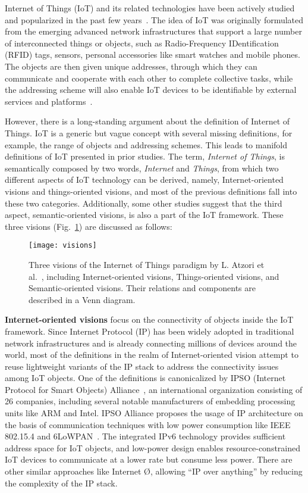  Internet of Things (IoT) and its related technologies have been actively studied and popularized in the past few years~\cite{DBLP:journals/cn/AtzoriIM10}. The idea of IoT was originally formulated from the emerging advanced network infrastructures that support a large number of interconnected things or objects, such as Radio-Frequency IDentification (RFID) tags, sensors, personal accessories like smart watches and mobile phones. The objects are then given unique addresses, through which they can communicate and cooperate with each other to complete collective tasks, while the addressing scheme will also enable IoT devices to be identifiable by external services and platforms~\cite{giusto2010internet}\cite{tan2010future}.

However, there is a long-standing argument about the definition of  Internet of Things. IoT is a generic but vague concept with several missing definitions, for example, the range of objects and addressing schemes. This leads to manifold definitions of IoT presented in prior studies. The term, \textit{Internet of Things}, is semantically composed by two words, \textit{Internet} and \textit{Things}, from which two different aspects of IoT technology can be derived, namely, Internet-oriented visions and things-oriented visions, and most of the previous definitions fall into these two categories. Additionally, some other studies suggest that the third aspect, semantic-oriented visions, is also a part of the IoT framework. These three visions (Fig.~\ref{fig:visions}) are discussed as follows:

\begin{figure}[htbp]
	\centering
  	\texttt{[image: visions]}
  	\caption{Three visions of the Internet of Things paradigm by L. Atzori et al.~\cite{DBLP:journals/cn/AtzoriIM10}, including Internet-oriented visions, Things-oriented visions, and Semantic-oriented visions. Their relations and components are  described in a Venn diagram.}
  	\label{fig:visions}
\end{figure}

\textbf{Internet-oriented visions} focus on the connectivity of objects inside the IoT framework. Since Internet Protocol (IP) has been widely adopted in traditional network infrastructures and is already connecting millions of devices around the world, most of the definitions in the realm of Internet-oriented vision attempt to reuse lightweight variants of the IP stack to address the connectivity issues among IoT objects. One of the definitions is canonicalized by IPSO (Internet Protocol for Smart Objects) Alliance~\cite{vasseur2008ip}, an international organization consisting of 26 companies, including several notable manufacturers of embedding processing units like ARM and Intel. IPSO Alliance proposes the usage of IP architecture on the basis of communication techniques with low power consumption like IEEE 802.15.4 and 6LoWPAN~\cite{culler20096lowpan}. The integrated IPv6 technology  provides sufficient address space for IoT objects, and low-power design enables resource-constrained IoT devices to communicate at a lower rate but consume less power. There are other similar approaches like Internet {\O}, allowing ``IP over anything'' by reducing the complexity of the IP stack.

